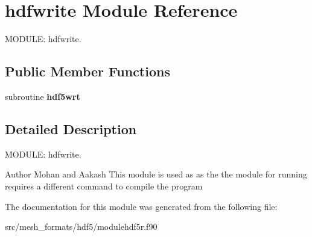 \hypertarget{classhdfwrite}{\section{hdfwrite Module Reference}
\label{classhdfwrite}
}


M\-O\-D\-U\-L\-E\-: hdfwrite.  


\subsection*{Public Member Functions}
\begin{DoxyCompactItemize}
\item 
\hypertarget{classhdfwrite_a363e603bebeb97203078960461367f90}{subroutine {\bfseries hdf5wrt}}\label{classhdfwrite_a363e603bebeb97203078960461367f90}

\end{DoxyCompactItemize}


\subsection{Detailed Description}
M\-O\-D\-U\-L\-E\-: hdfwrite. 

\begin{DoxyAuthor}{Author}
Mohan and Aakash This module is used as as the the module for running requires a different command to compile the program 
\end{DoxyAuthor}


The documentation for this module was generated from the following file\-:\begin{DoxyCompactItemize}
\item 
src/mesh\-\_\-formats/hdf5/modulehdf5r.\-f90\end{DoxyCompactItemize}
